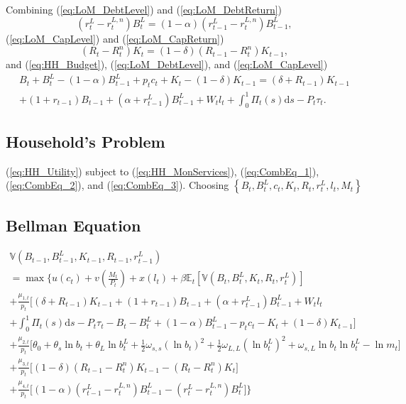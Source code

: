 \documentclass[11pt,a4paper,margin=1.5in]{article}
\begin{document}
Combining (\ref{eq:LoM_DebtLevel}) and (\ref{eq:LoM_DebtReturn})
\begin{equation}
	\left(r^L_t-r^{L,n}_t\right)B^L_t = (1-\alpha)\left(r^L_{t-1}-r^{L,n}_t\right)B^L_{t-1},
	\label{eq:CombEq_1}
\end{equation}
(\ref{eq:LoM_CapLevel}) and (\ref{eq:LoM_CapReturn})
\begin{equation}
	\left(R_t-R^{n}_t\right)K_t = (1-\delta)\left(R_{t-1}-R^{n}_t\right)K_{t-1},
	\label{eq:CombEq_2}
\end{equation}
and (\ref{eq:HH_Budget}), (\ref{eq:LoM_DebtLevel}), and (\ref{eq:LoM_CapLevel})
\begin{multline}
	B_t + B^{L}_t - (1-\alpha)B^L_{t-1} + p_tc_t + K_t - (1-\delta)K_{t-1} = (\delta + R_{t-1})K_{t-1} \\+ (1+r_{t-1})B_{t-1} + (\alpha + r^L_{t-1})B^L_{t-1} + W_tl_t + \int^1_0\Pi_t(s)\text{d}s - P_t\tau_t.
	\label{eq:CombEq_3}
\end{multline}

\subsection{Household's Problem}
(\ref{eq:HH_Utility}) subject to (\ref{eq:HH_MonServices}), (\ref{eq:CombEq_1}), (\ref{eq:CombEq_2}), and (\ref{eq:CombEq_3}). Choosing 
$\left\{B_t, B^L_t, c_t, K_t, R_t, r^L_t, l_t, M_t\right\}$

\subsection{Bellman Equation}

\begin{multline}
	\mathbb{V}\!\left(B_{t-1}, B^L_{t-1}, K_{t-1}, R_{t-1}, r^L_{t-1}\right) \\= \max \Bigg\{u(c_t) + v\left(\frac{M_t}{P_t}\right) + x(l_t)  + \beta\mathbb{E}_t\!\left[\mathbb{V}\!\left(B_{t}, B^L_{t}, K_{t}, R_{t}, r^L_{t}\right)\right] \\
	+ \frac{\mu_{1,t}}{p_t} \Big[(\delta + R_{t-1})K_{t-1} + (1+r_{t-1})B_{t-1} + (\alpha + r^L_{t-1})B^L_{t-1} + W_tl_t \\+ \int^1_0\Pi_t(s)\text{d}s -P_t\tau_t -B_t - B^{L}_t + (1-\alpha)B^L_{t-1} - p_tc_t - K_t + (1-\delta)K_{t-1}\Big] \\
	+ \frac{\mu_{2,t}}{p_t}\Bigg[\theta_0 + \theta_s \ln b_t + \theta_L \ln b^L_t + \frac{1}{2}\omega_{s,s} \left(\ln b_t\right)^2 + \frac{1}{2}\omega_{L,L} \left(\ln b^L_t\right)^2 + \omega_{s,L}\ln b_t \ln b^L_t-\ln m_t\Bigg] \\
	+ \frac{\mu_{3,t}}{p_t}\Big[(1-\delta)\left(R_{t-1}-R^{n}_t\right)K_{t-1} - \left(R_t-R^{n}_t\right)K_t \Big] \\
	+ \frac{\mu_{4,t}}{p_t} \Big[(1-\alpha)\left(r^L_{t-1}-r^{L,n}_t\right)B^L_{t-1} - \left(r^L_t-r^{L,n}_t\right)B^L_t\Big]\Bigg\}
	\label{eq:Bellman}
\end{multline}
\end{document}
